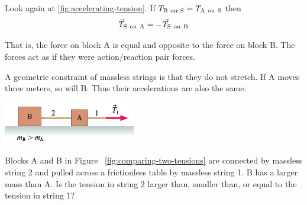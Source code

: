 Look again at%
\ref{fig:accelerating-tension}.  If
$
    T_{\mathrm{B~on~S}} = T_{\mathrm{A~on~S}}
$ then
\begin{equation}
    \vec{T}_{\mathrm{S~on~A}} = -\vec{T}_{\mathrm{S~on~B}}
\end{equation}

That is, the force on block A is equal and opposite to the force on
block B. The forces act as if they were action/reaction pair forces.
\begin{remark}
    A geometric constraint of massless strings is that they do not
    stretch.  If A moves three meters, so will B. Thus their
    accelerations are also the same.
\end{remark}
\begin{Exercise}[title={Comparing two tensions} origin={Knight}]
    \begin{minipage}[t]
        {0.4\linewidth}
        \vspace{-2ex} \includegraphics[width=\textwidth]{../figures/comparing-two-tensions.png}
        \label{fig:comparing-two-tensions}
    \end{minipage}
    Blocks A and B in Figure~%
    \ref{fig:comparing-two-tensions} are connected by massless string 2
    and pulled across a frictionless table by massless string 1.  B has
    a larger mass than A. Is the tension in string 2 larger than,
    smaller than, or equal to the tension in string 1?
\end{Exercise}
